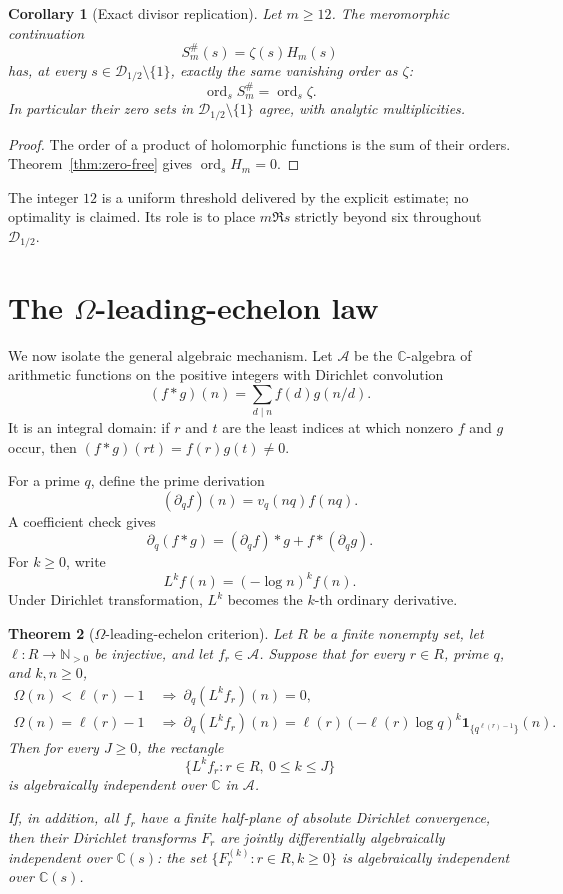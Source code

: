 \documentclass[11pt]{article}
\newtheorem{theorem}{Theorem}[section]
\newtheorem{corollary}[theorem]{Corollary}
\theoremstyle{definition}
\theoremstyle{remark}
\newcommand{\C}{\mathbb C}
\newcommand{\N}{\mathbb N}
\newcommand{\cA}{\mathcal A}
\newcommand{\cD}{\mathcal D}
\newcommand{\ord}{\operatorname{ord}}
\begin{document}
\begin{corollary}[Exact divisor replication]\label{cor:divisor}
Let \(m\geq12\).  The meromorphic continuation
\[
 S_m^\#(s)=\zeta(s)H_m(s)
\]
has, at every \(s\in\cD_{1/2}\setminus\{1\}\), exactly the same vanishing order as \(\zeta\):
\[
 \ord_s S_m^\#=\ord_s\zeta.
 \tag{3.2}
\]
In particular their zero sets in \(\cD_{1/2}\setminus\{1\}\) agree, with analytic
multiplicities.
\end{corollary}

\begin{proof}
The order of a product of holomorphic functions is the sum of their orders.
Theorem~\ref{thm:zero-free} gives \(\ord_sH_m=0\).
\end{proof}

The integer \(12\) is a uniform threshold delivered by the explicit estimate; no optimality is
claimed.  Its role is to place \(m\Re s\) strictly beyond six throughout \(\cD_{1/2}\).

\section{The \texorpdfstring{\(\Omega\)}{Omega}-leading-echelon law}\label{sec:omega}

We now isolate the general algebraic mechanism.  Let \(\cA\) be the \(\C\)-algebra of arithmetic
functions on the positive integers with Dirichlet convolution
\[
 (f*g)(n)=\sum_{d\mid n}f(d)g(n/d).
\]
It is an integral domain: if \(r\) and \(t\) are the least indices at which nonzero \(f\) and
\(g\) occur, then \((f*g)(rt)=f(r)g(t)\ne0\).

For a prime \(q\), define the prime derivation
\[
 (\partial_qf)(n)=v_q(nq)f(nq).
 \label{eq:prime-derivation}
 \tag{4.1}
\]
A coefficient check gives
\[
 \partial_q(f*g)=(\partial_qf)*g+f*(\partial_qg).
 \tag{4.2}
\]
For \(k\geq0\), write
\[
 L^kf(n)=(-\log n)^k f(n).
 \tag{4.3}
\]
Under Dirichlet transformation, \(L^k\) becomes the \(k\)-th ordinary derivative.

\begin{theorem}[\(\Omega\)-leading-echelon criterion]\label{thm:omega}
Let \(R\) be a finite nonempty set, let \(\ell:R\to\N_{>0}\) be injective, and let
\(f_r\in\cA\).  Suppose that for every \(r\in R\), prime \(q\), and \(k,n\geq0\),
\begin{align}
 \Omega(n)<\ell(r)-1
 &\ \Longrightarrow\ 
 \partial_q(L^kf_r)(n)=0,
 \label{eq:below}
 \tag{4.4}\\
 \Omega(n)=\ell(r)-1
 &\ \Longrightarrow\
 \partial_q(L^kf_r)(n)
 =\ell(r)(-\ell(r)\log q)^k
 \mathbf 1_{\{q^{\ell(r)-1}\}}(n).
 \label{eq:leading}
 \tag{4.5}
\end{align}
Then for every \(J\geq0\), the rectangle
\[
 \{L^kf_r:r\in R,\ 0\leq k\leq J\}
 \label{eq:jet-rectangle}
 \tag{4.6}
\]
is algebraically independent over \(\C\) in \(\cA\).

If, in addition, all \(f_r\) have a finite half-plane of absolute Dirichlet convergence, then
their Dirichlet transforms \(F_r\) are jointly differentially algebraically independent over
\(\C(s)\): the set \(\{F_r^{(k)}:r\in R,k\geq0\}\) is algebraically independent over
\(\C(s)\).
\end{theorem}
\end{document}
